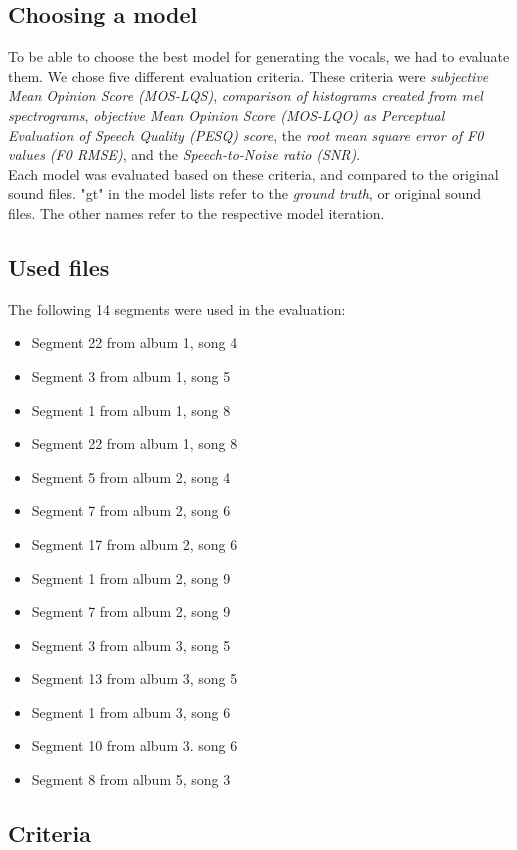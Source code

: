 \documentclass[a4paper]{article}
\begin{document}
\subsection*{Choosing a model}

To be able to choose the best model for generating the vocals, we had to
evaluate them. We chose five different evaluation criteria. These criteria were
\emph{subjective Mean Opinion Score (MOS-LQS)}, \emph{comparison of histograms
    created from mel spectrograms}, \emph{objective Mean Opinion Score (MOS-LQO) as
    Perceptual Evaluation of Speech Quality (PESQ) score}, the \emph{root mean
    square error of F0 values (F0 RMSE)}, and the \emph{Speech-to-Noise ratio
    (SNR)}. \\
Each model was evaluated based on these criteria, and compared to the original
sound files. "gt" in the model lists refer to the \emph{ground truth}, or
original sound files. The other names refer to the respective model iteration.

\subsection*{Used files}
The following 14 segments were used in the evaluation:
\begin{itemize}
    \item Segment 22 from album 1, song 4
    \item Segment 3 from album 1, song 5
    \item Segment 1 from album 1, song 8
    \item Segment 22 from album 1, song 8
    \item Segment 5 from album 2, song 4
    \item Segment 7 from album 2, song 6
    \item Segment 17 from album 2, song 6
    \item Segment 1 from album 2, song 9
    \item Segment 7 from album 2, song 9
    \item Segment 3 from album 3, song 5
    \item Segment 13 from album 3, song 5
    \item Segment 1 from album 3, song 6
    \item Segment 10 from album 3. song 6
    \item Segment 8 from album 5, song 3
\end{itemize}

\subsection*{Criteria}
\end{document}
